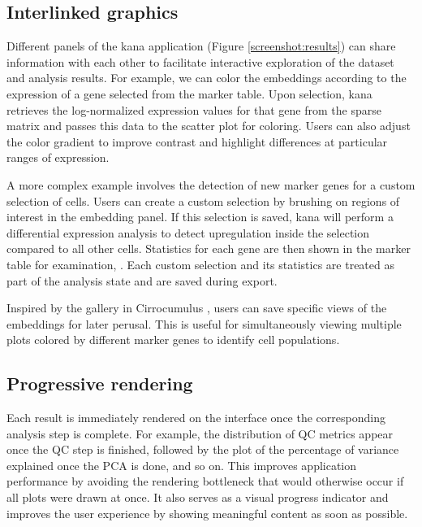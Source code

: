 \documentclass{article}
\begin{document}
\subsection{Interlinked graphics}

Different panels of the kana application (Figure \ref{screenshot:results}) can share information with each other to facilitate interactive exploration of the dataset and analysis results.
For example, we can color the embeddings according to the expression of a gene selected from the marker table.
Upon selection, kana retrieves the log-normalized expression values for that gene from the sparse matrix and passes this data to the scatter plot for coloring.
Users can also adjust the color gradient to improve contrast and highlight differences at particular ranges of expression.

A more complex example involves the detection of new marker genes for a custom selection of cells.
Users can create a custom selection by brushing on regions of interest in the embedding panel.
If this selection is saved, kana will perform a differential expression analysis to detect upregulation inside the selection compared to all other cells.
Statistics for each gene are then shown in the marker table for examination, .
Each custom selection and its statistics are treated as part of the analysis state and are saved during export. 

Inspired by the gallery in Cirrocumulus \cite{cirrocumulus}, users can save specific views of the embeddings for later perusal.
This is useful for simultaneously viewing multiple plots colored by different marker genes to identify cell populations.

\subsection{Progressive rendering}

Each result is immediately rendered on the interface once the corresponding analysis step is complete.
For example, the distribution of QC metrics appear once the QC step is finished, followed by the plot of the percentage of variance explained once the PCA is done, and so on.
This improves application performance by avoiding the rendering bottleneck that would otherwise occur if all plots were drawn at once. 
It also serves as a visual progress indicator and improves the user experience by showing meaningful content as soon as possible.
\end{document}
